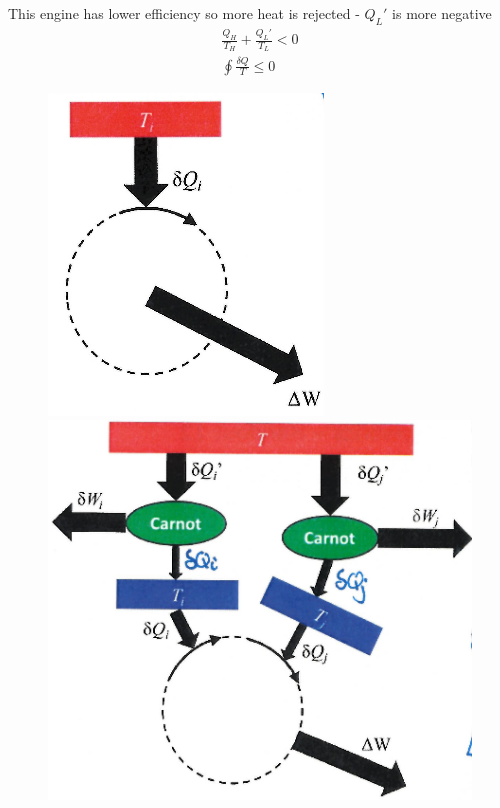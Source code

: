 \documentclass[a4paper, 11pt, normalem]{report}
\begin{document}
This engine has lower efficiency so more heat is rejected - $Q_L'$ is more negative
\begin{gather*}
    \frac{Q_{H}}{T_H} + \frac{Q_{L}'}{T_L} < 0 \\
    \oint \frac{\delta Q}{T} \leq 0
\end{gather*}

\begin{figure}
    \begin{center}
        \vspace{-30pt}
        \includegraphics[scale=0.5]{Clausius3.png} \\
        \includegraphics[scale=0.4]{Clausius4.png}
        \vspace{-150pt}
    \end{center}
\end{figure}
\end{document}
